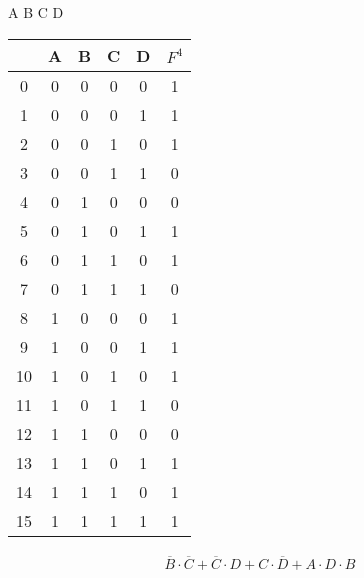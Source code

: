 \documentclass{article}
\begin{document}
\newpage
A B C D
\begin{table}[ht]
    \begin{tabular}{c|c|c|c|c||c}
           & \textbf{A} & \textbf{B} & \textbf{C} & \textbf{D} & \textbf{\(F^4\)} \\
        \hline
        0  & 0          & 0          & 0          & 0          & 1                \\
        \hline
        1  & 0          & 0          & 0          & 1          & 1                \\
        \hline
        2  & 0          & 0          & 1          & 0          & 1                \\
        \hline
        3  & 0          & 0          & 1          & 1          & 0                \\
        \hline
        4  & 0          & 1          & 0          & 0          & 0                \\
        \hline
        5  & 0          & 1          & 0          & 1          & 1                \\
        \hline
        6  & 0          & 1          & 1          & 0          & 1                \\
        \hline
        7  & 0          & 1          & 1          & 1          & 0                \\
        \hline
        8  & 1          & 0          & 0          & 0          & 1                \\
        \hline
        9  & 1          & 0          & 0          & 1          & 1                \\
        \hline
        10 & 1          & 0          & 1          & 0          & 1                \\
        \hline
        11 & 1          & 0          & 1          & 1          & 0                \\
        \hline
        12 & 1          & 1          & 0          & 0          & 0                \\
        \hline
        13 & 1          & 1          & 0          & 1          & 1                \\
        \hline
        14 & 1          & 1          & 1          & 0          & 1                \\
        \hline
        15 & 1          & 1          & 1          & 1          & 1                \\
    \end{tabular}
\end{table}

\begin{align*}
    \overline{B} \cdot \overline{C} + \overline{C} \cdot D + C \cdot \overline{D} + A \cdot D \cdot B \\
\end{align*}
\end{document}
